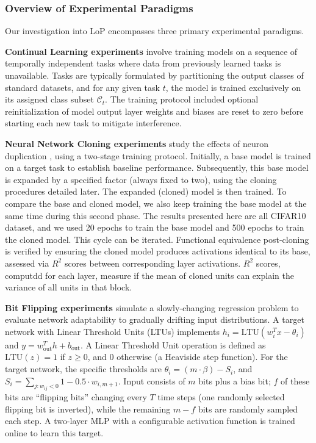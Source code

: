 \documentclass{article}
\numberwithin{figure}{section}
\begin{document}
\subsubsection{Overview of Experimental Paradigms}
\label{subsec:experiment_paradigms}

Our investigation into LoP encompasses three primary experimental paradigms.

\textbf{Continual Learning experiments} involve training models on a sequence of temporally independent tasks where data from previously learned tasks is unavailable. Tasks are typically formulated by partitioning the output classes of standard datasets, and for any given task $t$, the model is trained exclusively on its assigned class subset $\mathcal{C}_t$. The training protocol included optional reinitialization of model output layer weights and biases are reset to zero before starting each new task to mitigate interference.

\textbf{Neural Network Cloning experiments} study the effects of neuron duplication , using a two-stage training protocol. Initially, a base model is trained on a target task to establish baseline performance. Subsequently, this base model is expanded by a specified factor (always fixed to two), using the cloning procedures detailed later.  The expanded (cloned) model is then trained. To compare the base and cloned model, we also keep training the base model at the same time during this second phase. The results presented here are all CIFAR10 dataset, and we used 20 epochs to train the base model and 500 epochs to train the cloned model. This cycle can be iterated. Functional equivalence post-cloning is verified by ensuring the cloned model produces activations identical to its base, assessed via $R^2$ scores between corresponding layer activations. $R^2$ scores, computdd for each layer, measure if the mean of cloned units can explain the variance of all units in that block. 

\textbf{Bit Flipping experiments} simulate a slowly-changing regression problem to evaluate network adaptability to gradually drifting input distributions. 
A target network with Linear Threshold Units (LTUs) implements $h_i = \text{LTU}(w_i^T x - \theta_i)$ and $y = w_{\text{out}}^T h + b_{\text{out}}$. A Linear Threshold Unit operation is defined as $\text{LTU}(z) = 1$ if $z \ge 0$, and $0$ otherwise (a Heaviside step function). For the target network, the specific thresholds are $\theta_i = (m \cdot \beta) - S_i$, and $S_i = \sum_{j: w_{ij} < 0} 1 - 0.5 \cdot w_{i,m+1}$. Input consists of $m$ bits plus a bias bit; $f$ of these bits are ``flipping bits'' changing every $T$ time steps (one randomly selected flipping bit is inverted), while the remaining $m-f$ bits are randomly sampled each step. A two-layer MLP with a configurable activation function is trained online to learn this target.
\end{document}
